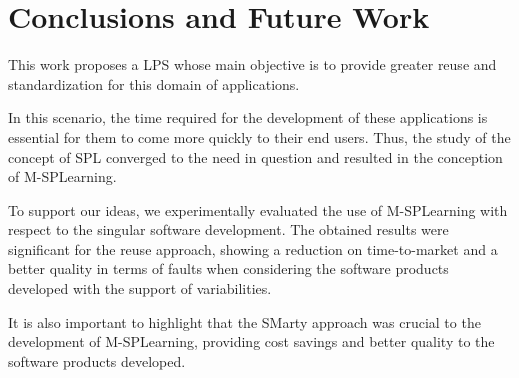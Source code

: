 \section{Conclusions and Future Work}\label{section7}



This work proposes a LPS whose main objective is to provide greater reuse and standardization for this domain of applications.


In this scenario, the time required for the development of these applications is essential for them to come more quickly to their end users. Thus, the study of the concept of SPL converged to the need in question and resulted in the conception of M-SPLearning.

To support our ideas, we experimentally evaluated the use of M-SPLearning with respect to the singular software development. The obtained results were significant for the reuse approach, showing a reduction on time-to-market and a better quality in terms of faults when considering the software products developed with the support of variabilities. 

It is also important to highlight that the SMarty approach was crucial to the development of M-SPLearning, providing cost savings and better quality to the software products developed.

